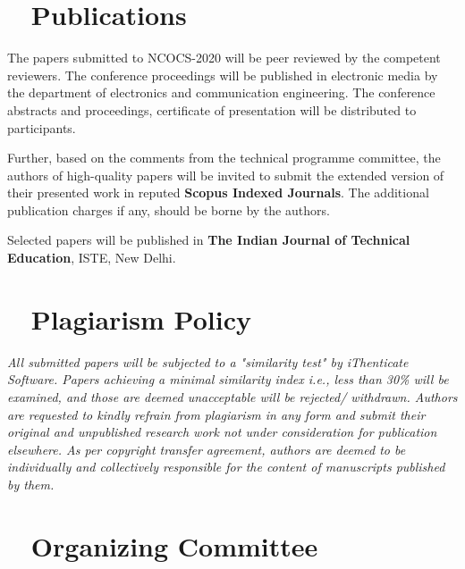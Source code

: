 \documentclass[12pt,a3paper, foldmark,notumble]{leaflet}
\begin{document}
\section{\faBook~ Publications}
The papers submitted to NCOCS-2020 will be peer reviewed by the competent reviewers. The conference proceedings will be published in electronic media by the department of electronics and communication engineering. The conference abstracts and proceedings, certificate of presentation will be distributed to participants.

Further, based on the comments from the technical programme committee, the authors of high-quality papers will be invited to submit the extended version of their presented work in reputed \textbf{\color{red} Scopus Indexed Journals}. The additional publication charges if any, should be borne by the authors. 

Selected papers will be published in \textbf{\color{red} The Indian Journal of Technical Education}, ISTE, New Delhi. 

\section{\faPencilSquareO~ Plagiarism Policy}
\begin{tcolorbox}[colframe=olive,title= {\color{orange}\textbf{}}]
	\emph{ 
		All submitted papers will be subjected to a "similarity test" by iThenticate Software. Papers achieving a minimal similarity index \emph{i.e.,} less than 30\% will be examined, and those are deemed unacceptable will be rejected/ withdrawn. Authors are requested to kindly refrain from plagiarism in any form and submit their original and unpublished research work not under consideration for publication elsewhere. As per copyright transfer agreement, authors are deemed to be individually and collectively responsible for the content of manuscripts published by them.}  
\end{tcolorbox}


\clearpage
\linespread{1}
\section{\faGroup~ Organizing Committee}
\vspace{6pt}
\end{document}
